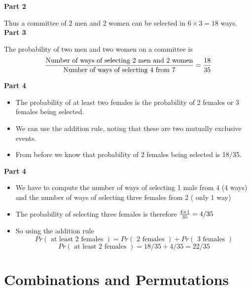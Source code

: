 \documentclass[12pt]{report}
\begin{document}
	{\Large
		
		\textbf{Part 2}
		
		Thus a committee of 2 men and 2 women can be selected in $ 6 \times 3  = 18 $ ways.\\
		\bigskip
		\textbf{Part 3}
		
		The probability of two men and two women on a committee is
		\[ {\mbox{Number of ways of selecting 2 men and 2 women} \over \mbox{Number of ways of selecting 4 from 7}} = {18 \over 35 }\]
		
	}
	{\Large
		
		\textbf{Part 4}
		\begin{itemize}
			\item The probability of at least two females is the probability of 2 females or 3 females being selected.
			\item We can use the addition rule, noting that these are two mutually exclusive events.
			\item From before we know that probability of 2 females being selected is 18/35.
		\end{itemize}
		
	}
	{\Large
		
		\textbf{Part 4}
		\begin{itemize}
			\item We have to compute the number of ways of selecting 1 male from 4 (4 ways) and the number of ways of selecting three females from 2 ( only 1 way)
			\item The probability of selecting three females is therefore ${4 \times 1 \over 35} = 4/35$
			\item So using the addition rule
			\[ Pr(\mbox{ at least 2 females }) = Pr(\mbox{ 2 females }) + Pr(\mbox{ 3 females }) \]
			\[ Pr(\mbox{ at least 2 females })  = 18/35 + 4/35 = 22/35 \]
		\end{itemize}
		
	}
	
	
	
	\section{ Combinations and Permutations }
	
\end{document}
